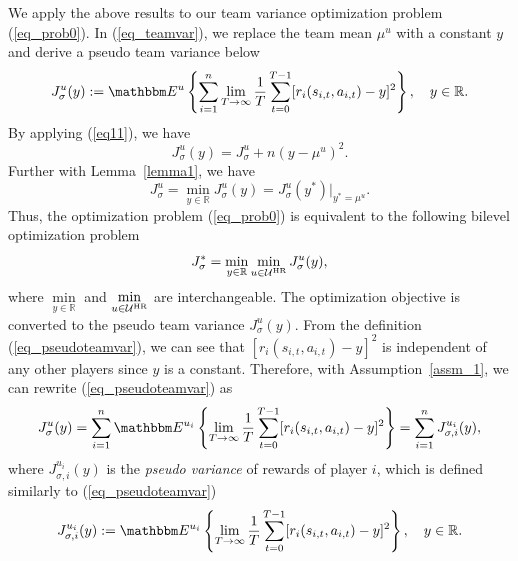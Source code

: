 \documentclass[12pt]{article}
\begin{document}
We apply the above results to our team variance optimization problem
(\ref{eq_prob0}). In (\ref{eq_teamvar}), we replace the team mean
$\mu^u$ with a constant $y$ and derive a pseudo team variance below
\begin{equation}\label{eq_pseudoteamvar}
J^u_{\sigma}(y) := \mathbbm E^u \left\{ \sum_{i=1}^{n}
\lim\limits_{T \rightarrow \infty}
\frac{1}{T}\sum_{t=0}^{T-1}[r_i(s_{i,t}, a_{i,t}) - y]^2 \right\},
\quad y \in \mathbb R.
\end{equation}
By applying (\ref{eq11}), we have
\begin{equation}\label{eq14}
J^u_{\sigma}(y) = J^u_{\sigma} + n(y - \mu^u)^2.
\end{equation}
Further with Lemma~\ref{lemma1}, we have
\begin{equation*}
J^u_{\sigma} = \min_{y \in \mathbb R} J^u_{\sigma}(y) =
J^u_{\sigma}(y^*)\Big|_{y^* = \mu^u}.
\end{equation*}
Thus, the optimization problem (\ref{eq_prob0}) is equivalent to the
following bilevel optimization problem
\begin{equation}\label{eq_bilevelprob}
J^*_{\sigma} = \min_{y \in \mathbb R}\min_{u \in \mathcal U^{\rm
HR}} J^u_{\sigma}(y),
\end{equation}
where $\min\limits_{y \in \mathbb R}$ and $\min\limits_{u \in
\mathcal U^{\rm HR}}$ are interchangeable. The optimization
objective is converted to the pseudo team variance
$J^u_{\sigma}(y)$. From the definition (\ref{eq_pseudoteamvar}), we
can see that $[r_i(s_{i,t}, a_{i,t}) - y]^2$ is independent of any
other players since $y$ is a constant. Therefore, with
Assumption~\ref{assm_1}, we can rewrite (\ref{eq_pseudoteamvar}) as
\begin{equation}\label{eq_pseudoteamvar2}
J^u_{\sigma}(y) = \sum_{i=1}^{n} \mathbbm E^{u_i} \left\{
\lim\limits_{T \rightarrow \infty}
\frac{1}{T}\sum_{t=0}^{T-1}[r_i(s_{i,t}, a_{i,t}) - y]^2 \right\} =
\sum_{i=1}^{n} J^{u_i}_{\sigma,i}(y),
\end{equation}
where $J^{u_i}_{\sigma,i}(y)$ is the \emph{pseudo variance} of
rewards of player $i$, which is defined similarly to
(\ref{eq_pseudoteamvar})
\begin{equation}\label{eq_pseudoteamvar-i}
J^{u_i}_{\sigma,i}(y) := \mathbbm E^{u_i} \left\{ \lim\limits_{T
\rightarrow \infty} \frac{1}{T}\sum_{t=0}^{T-1}[r_i(s_{i,t},
a_{i,t}) - y]^2 \right\}, \quad y \in \mathbb R.
\end{equation}
\end{document}
